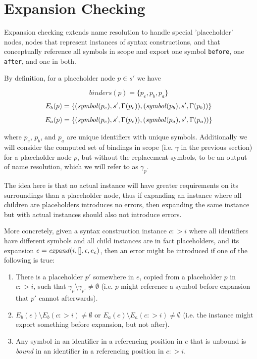 \documentclass{kththesis}
\begin{document}

\section{Expansion Checking} \label{sec:expansion-checking-formalization}

Expansion checking extends name resolution to handle special 'placeholder' nodes, nodes that represent instances of syntax constructions, and that conceptually reference all symbols in scope and export one symbol \texttt{before}, one \texttt{after}, and one in both.

By definition, for a placeholder node $p \in s'$ we have

$$ binders(p) = \{p_e, p_b, p_a\} $$
$$ E_b(p) = \{(\mathit{symbol}(p_e), s', \Gamma(p_e)), (\mathit{symbol}(p_b), s', \Gamma(p_b))\} $$
$$ E_a(p) = \{(\mathit{symbol}(p_e), s', \Gamma(p_e)), (\mathit{symbol}(p_a), s', \Gamma(p_a))\} $$

where $p_e$, $p_b$, and $p_a$ are unique identifiers with unique symbols. Additionally we will consider the computed set of bindings in scope (i.e. $\gamma$ in the previous section) for a placeholder node $p$, but without the replacement symbols, to be an output of name resolution, which we will refer to as $\gamma_p$.

The idea here is that no actual instance will have greater requirements on its surroundings than a placeholder node, thus if expanding an instance where all children are placeholders introduces no errors, then expanding the same instance but with actual instances should also not introduce errors.

More concretely, given a syntax construction instance $c :> i$ where all identifiers have different symbols and all child instances are in fact placeholders, and its expansion $e = \mathit{expand}(i, [], \epsilon, e_c)$, then an error might be introduced if one of the following is true:

\begin{enumerate}
  \item There is a placeholder $p'$ somewhere in $e$, copied from a placeholder $p$ in $c :> i$, such that $\gamma_p \setminus \gamma_{p'} \neq \emptyset$ (i.e. $p$ might reference a symbol before expansion that $p'$ cannot afterwards).
  \item $E_b(e) \setminus E_b(c :> i) \neq \emptyset$ or $E_a(e) \setminus E_a(c :> i) \neq \emptyset$ (i.e. the instance might export something before expansion, but not after).
  \item Any symbol in an identifier in a referencing position in $e$ that is unbound is \emph{bound} in an identifier in a referencing position in $c :> i$.
\end{enumerate}
\end{document}
